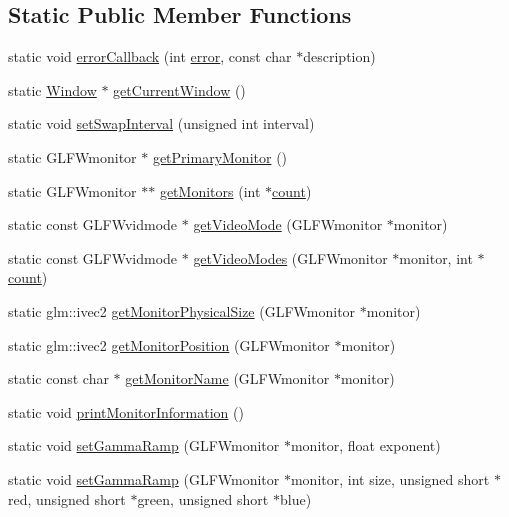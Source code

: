 \subsection*{Static Public Member Functions}
\begin{DoxyCompactItemize}
\item 
static void \mbox{\hyperlink{classec_1_1_window_a1d202aaa954ea0b62cf380fb48288107}{error\+Callback}} (int \mbox{\hyperlink{namespaceec_a67e511e8b22e1051ea392cb2f68315d8acb5e100e5a9a3e7f6d1fd97512215282}{error}}, const char $\ast$description)
\item 
static \mbox{\hyperlink{classec_1_1_window}{Window}} $\ast$ \mbox{\hyperlink{classec_1_1_window_aca8cec4837055174791755b5bdef5949}{get\+Current\+Window}} ()
\item 
static void \mbox{\hyperlink{classec_1_1_window_a42f80dede17ab5a599b4cadf0b621d90}{set\+Swap\+Interval}} (unsigned int interval)
\item 
static G\+L\+F\+Wmonitor $\ast$ \mbox{\hyperlink{classec_1_1_window_ae519ec5a903d9ed1cefec30a4571a938}{get\+Primary\+Monitor}} ()
\item 
static G\+L\+F\+Wmonitor $\ast$$\ast$ \mbox{\hyperlink{classec_1_1_window_a535eb59e75e88a2a9254e25f4dc878dc}{get\+Monitors}} (int $\ast$\mbox{\hyperlink{namespaceec_a30e2a743ebdeb02ac68a6cfa50f629c7ae2942a04780e223b215eb8b663cf5353}{count}})
\item 
static const G\+L\+F\+Wvidmode $\ast$ \mbox{\hyperlink{classec_1_1_window_a1be4ec4d16ead306b318e69b166d9bc9}{get\+Video\+Mode}} (G\+L\+F\+Wmonitor $\ast$monitor)
\item 
static const G\+L\+F\+Wvidmode $\ast$ \mbox{\hyperlink{classec_1_1_window_aeedb0015b967b685cd4e8facc3b37a77}{get\+Video\+Modes}} (G\+L\+F\+Wmonitor $\ast$monitor, int $\ast$\mbox{\hyperlink{namespaceec_a30e2a743ebdeb02ac68a6cfa50f629c7ae2942a04780e223b215eb8b663cf5353}{count}})
\item 
static glm\+::ivec2 \mbox{\hyperlink{classec_1_1_window_ace0f9940b132f4c072e1b2a1a6f72217}{get\+Monitor\+Physical\+Size}} (G\+L\+F\+Wmonitor $\ast$monitor)
\item 
static glm\+::ivec2 \mbox{\hyperlink{classec_1_1_window_aa7be3b867cfa6fa26f347eaa6a1d92ee}{get\+Monitor\+Position}} (G\+L\+F\+Wmonitor $\ast$monitor)
\item 
static const char $\ast$ \mbox{\hyperlink{classec_1_1_window_ad382278721c5532b83962bcd5e405d17}{get\+Monitor\+Name}} (G\+L\+F\+Wmonitor $\ast$monitor)
\item 
static void \mbox{\hyperlink{classec_1_1_window_aed6043c22655278bcb7d196b2a4ded82}{print\+Monitor\+Information}} ()
\item 
static void \mbox{\hyperlink{classec_1_1_window_a53def2c77bb150fade5085d9dcfdb1e1}{set\+Gamma\+Ramp}} (G\+L\+F\+Wmonitor $\ast$monitor, float exponent)
\item 
static void \mbox{\hyperlink{classec_1_1_window_aa23ab7022526a507f9a26c673f62d270}{set\+Gamma\+Ramp}} (G\+L\+F\+Wmonitor $\ast$monitor, int size, unsigned short $\ast$red, unsigned short $\ast$green, unsigned short $\ast$blue)
\end{DoxyCompactItemize}
